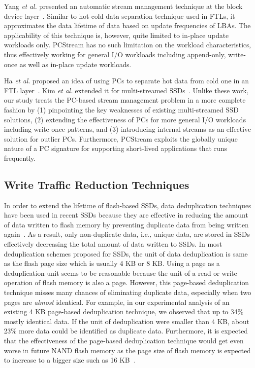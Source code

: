 Yang {\it et al.} presented an automatic stream management technique at the
block device layer~\cite{AutoStream}. Similar to hot-cold data separation
technique used in FTLs, it approximates the data lifetime of data based on
update frequencies of LBAs.  The applicability of this technique is, however,
quite limited to in-place update workloads only.  \textsf{\small PCStream} has
no such limitation on the workload characteristics, thus effectively working
for general I/O workloads including append-only, write-once 
as well as in-place update workloads.

Ha {\it et al.} proposed an idea of using PCs to separate hot data from cold
one in an FTL layer~\cite{PCHa}.  Kim {\it et al.} extended it for
multi-streamed SSDs~\cite{PCStream}.  Unlike these work, our study treats the
PC-based stream management problem in a more complete fashion by (1)
pinpointing the key weaknesses of existing multi-streamed SSD solutions, (2)
extending the effectiveness of PCs for more general I/O workloads including
write-once patterns, and (3) introducing internal streams as an effective
solution for outlier PCs.  Furthermore, \textsf{\small PCStream} exploits the
globally unique nature of a PC signature for supporting short-lived
applications that runs frequently.



\subsection{Write Traffic Reduction Techniques}
In order to extend the lifetime of flash-based SSDs,
data deduplication techniques have been used in recent SSDs
because they are effective in reducing the amount of data written to flash memory by preventing duplicate data from being written again~\cite{caftl,value-locality}.
As a result, only non-duplicate data, i.e., unique data, are stored in SSDs effectively decreasing the total amount of data written to
SSDs.
In most deduplication schemes proposed for SSDs,
the unit of data deduplication is same as the flash page size which is usually 4 KB or 8 KB.
Using a page as a deduplication unit seems to be reasonable 
because the unit of a read or write operation of flash memory is also a page. 
However, this page-based deduplication technique misses many chances of eliminating duplicate data, especially
when two pages are \textit{almost} identical.
For example, in our experimental analysis of an existing 4 KB page-based deduplication technique, we observed that
up to 34\% mostly identical data.
If the unit of deduplication were smaller than 4 KB, about 23\% more data could be identified as duplicate data.
Furthermore, it is expected that the effectiveness of the page-based deduplication technique would 
get even worse in future NAND flash memory as the page size of 
flash memory is expected to increase
to a bigger size such as 16 KB~\cite{16kpage}.

